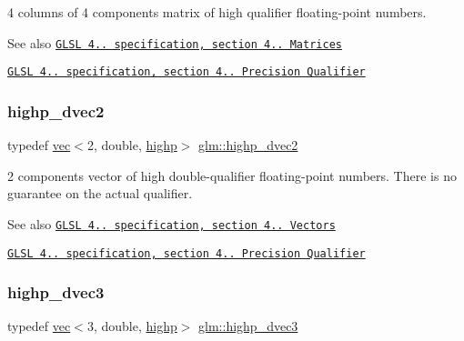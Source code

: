 4 columns of 4 components matrix of high qualifier floating-\/point numbers.

\begin{DoxySeeAlso}{See also}
\href{http://www.opengl.org/registry/doc/GLSLangSpec.4.20.8.pdf}{\tt G\+L\+SL 4.. specification, section 4.. Matrices} 

\href{http://www.opengl.org/registry/doc/GLSLangSpec.4.20.8.pdf}{\tt G\+L\+SL 4.. specification, section 4.. Precision Qualifier} 
\end{DoxySeeAlso}
\mbox{\label{group__core__precision_gadec51e8e57b72d8fc95e87f18d1ad4dd}} 
\subsubsection{\texorpdfstring{highp\+\_\+dvec2}{highp\_dvec2}}
{\footnotesize\ttfamily typedef \mbox{\hyperlink{structglm_1_1vec}{vec}}$<$2, double, \mbox{\hyperlink{namespaceglm_a36ed105b07c7746804d7fdc7cc90ff25ac6f7eab42eacbb10d59a58e95e362074}{highp}}$>$ \mbox{\hyperlink{group__core__precision_gadec51e8e57b72d8fc95e87f18d1ad4dd}{glm\+::highp\+\_\+dvec2}}}

2 components vector of high double-\/qualifier floating-\/point numbers. There is no guarantee on the actual qualifier.

\begin{DoxySeeAlso}{See also}
\href{http://www.opengl.org/registry/doc/GLSLangSpec.4.20.8.pdf}{\tt G\+L\+SL 4.. specification, section 4.. Vectors} 

\href{http://www.opengl.org/registry/doc/GLSLangSpec.4.20.8.pdf}{\tt G\+L\+SL 4.. specification, section 4.. Precision Qualifier} 
\end{DoxySeeAlso}
\mbox{\label{group__core__precision_ga63f89fa26f599ac15428c9d1a70a5467}} 
\subsubsection{\texorpdfstring{highp\+\_\+dvec3}{highp\_dvec3}}
{\footnotesize\ttfamily typedef \mbox{\hyperlink{structglm_1_1vec}{vec}}$<$3, double, \mbox{\hyperlink{namespaceglm_a36ed105b07c7746804d7fdc7cc90ff25ac6f7eab42eacbb10d59a58e95e362074}{highp}}$>$ \mbox{\hyperlink{group__core__precision_ga63f89fa26f599ac15428c9d1a70a5467}{glm\+::highp\+\_\+dvec3}}}

